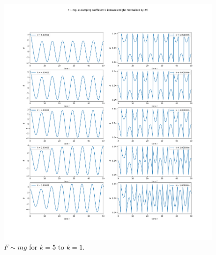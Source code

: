 \documentclass[10pt, twocolumn]{article}
\begin{document}
\begin{figure}
    \centering
    \includegraphics[width = \columnwidth]{Projects/ForcedSimplePendulum/Plots/F~mg as damping coefficient k increases from 5 to 1.png}
    \caption{$F \sim{mg}$ for $k = 5$ to $k = 1$.}
    \label{k 5 to 1}
\end{figure}
\end{document}
